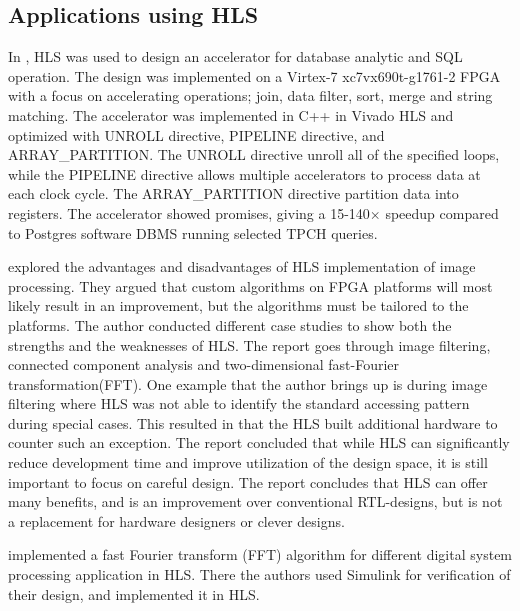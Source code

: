 \subsection{Applications using HLS}
In \citep{Malazgirt:2015:HLS:2889287.2889299}, HLS was used to design an accelerator for database analytic and SQL operation. The design was implemented on a Virtex-7 xc7vx690t-g1761-2 FPGA with a focus on accelerating operations; join, data filter, sort, merge and string matching. The accelerator was implemented in C++ in Vivado HLS and optimized with UNROLL directive, PIPELINE directive, and ARRAY\_PARTITION. The UNROLL directive unroll all of the specified loops, while the PIPELINE directive allows multiple accelerators to process data at each clock cycle. The ARRAY\_PARTITION directive partition data into registers.  The accelerator showed promises, giving a 15-140$\times$ speedup compared to Postgres software DBMS running selected TPC\-H queries. 

\cite{Bailey:2015:ALH:2789116.2789145} explored the advantages and disadvantages of HLS implementation of image processing. They argued that custom algorithms on FPGA platforms will most likely result in an improvement, but the algorithms must be tailored to the platforms. The author conducted different case studies to show both the strengths and the weaknesses of HLS. The report goes through image filtering, connected component analysis and two-dimensional fast-Fourier transformation(FFT). One example that the author brings up is during image filtering where HLS was not able to identify the standard accessing pattern during special cases. This resulted in that the HLS built additional hardware to counter such an exception. The report concluded that while HLS can significantly reduce development time and improve utilization of the design space, it is still important to focus on careful design.  The report concludes that HLS can offer many benefits, and is an improvement over conventional RTL-designs, but is not a replacement for hardware designers or clever designs. 

\cite{Butt:2016:DPH:2888407.2871737} implemented a fast Fourier transform (FFT) algorithm for different digital system processing application in HLS. There the authors used Simulink for verification of their design, and implemented it in HLS.

